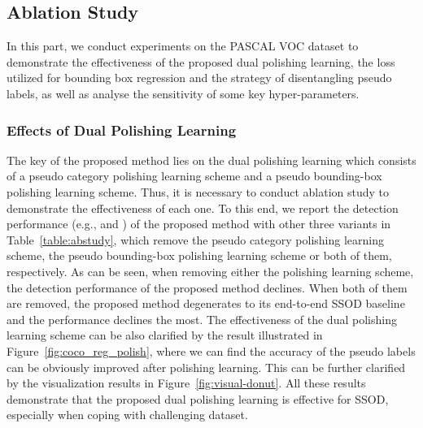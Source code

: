 \documentclass[letterpaper]{article} \usepackage{aaai23}  \usepackage{times}  \usepackage{helvet}  \usepackage{courier}  \usepackage[hyphens]{url}  \usepackage{graphicx} \urlstyle{rm} \def\UrlFont{\rm}  \usepackage{natbib}  \usepackage{caption} \frenchspacing  \setlength{\pdfpagewidth}{8.5in}  \setlength{\pdfpageheight}{11in}  \usepackage{algorithm}
\begin{document}
\subsection{Ablation Study}
\label{sec::ablation_study}
In this part, we conduct experiments on the PASCAL VOC dataset to demonstrate the effectiveness of the proposed dual polishing learning, the loss utilized for bounding box regression and the strategy of disentangling pseudo labels, as well as analyse the sensitivity of some key hyper-parameters. 



\begin{table}[t]  
\centering
\caption{Effect of the proposed dual polishing learning on PASCAL VOC dataset.}\label{table:abstudy}
\end{table}

\subsubsection{\textbf{Effects of Dual Polishing Learning}}
The key of the proposed method lies on the dual polishing learning which consists of a pseudo category polishing learning scheme and a pseudo bounding-box polishing learning scheme. Thus, it is necessary to conduct ablation study to demonstrate the effectiveness of each one. To this end, we report the detection performance (e.g.,  and ) of the proposed method with other three variants in Table~\ref{table:abstudy}, which remove the pseudo category polishing learning scheme, the pseudo bounding-box polishing learning scheme or both of them, respectively. As can be seen, when removing either the polishing learning scheme, the detection performance of the proposed method declines. When both of them are removed, the proposed method degenerates to its end-to-end SSOD baseline and the performance declines the most. The effectiveness of the dual polishing learning scheme can be also clarified by the result illustrated in Figure~\ref{fig:coco_reg_polish}, where we can find the accuracy of the pseudo labels can be obviously improved after polishing learning. This can be further clarified by the visualization results in Figure~\ref{fig:visual-donut}. All these results demonstrate that the proposed dual polishing learning is effective for SSOD, especially when coping with challenging dataset.
\end{document}
